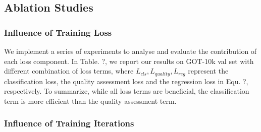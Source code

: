 \documentclass{article}
\begin{document}
\subsection{Ablation Studies}

\subsubsection{Influence of Training Loss}

We implement a series of experiments to analyse and evaluate the contribution of each loss component.
In Table. ?, we report our results on GOT-10k val set with different combination of loss terms, where $L_{cls}, L_{quality}, L_{reg}$ represent the classification loss, the quality assessment loss and the regression loss in Equ. ?, respectively.
To summarize, while all loss terms are beneficial, the classification term is more efficient than the quality assessment term. 

\begin{table}[h]
\centering
{}
\caption{Different loss weight.}
\end{table}

\subsubsection{Influence of Training Iterations}
\end{document}
